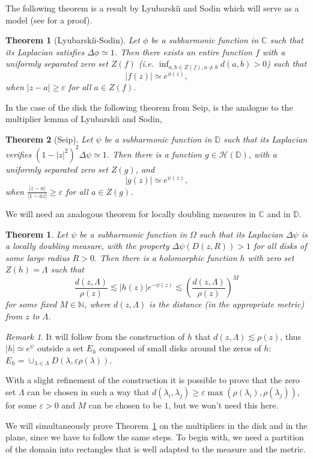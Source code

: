 \documentclass[12pt,twoside,final,psamsfonts]{amsart}
\theoremstyle{plain}
\newtheorem*{teor*}{Theorem}
\newtheorem{teor}{Theorem}
\theoremstyle{remark}
\newtheorem*{remark}{Remark}
\theoremstyle{definition}
\newcommand{\C}{{\mathbb C}}
\newcommand{\N}{{\mathbb N}}
\newcommand{\D}{{\mathbb D}}
\renewcommand{\H}{{\mathcal H}}
\begin{document}
The following theorem is a
result by Lyubarski{\u\i} and Sodin which will serve as a model
(see \cite{LyuSei94} for a proof).

\begin{teor*}[Lyubarski{\u\i}-Sodin]
Let $\phi$ be a subharmonic function in $\C$ such that its Laplacian 
satisfies $\Delta
\phi\simeq 1$. Then there exists an entire function $f$ with a uniformly 
separated 
zero set $Z(f)$ (i.e. $\inf_{a,b\in Z(f),a\ne b}d(a,b)>0$) such that 
\[
|f(z)|\simeq e^{\phi(z)},
\]
when $|z-a|\ge \varepsilon$ for all $a\in Z(f)$.
\end{teor*}


In the case of the disk the following theorem from Seip, \cite{Seip95b} is the
analogue to the multiplier lemma of Lyubarski{\u\i} and Sodin,

\begin{teor*}[Seip]
Let $\psi$ be a subharmonic function in $\D$ such that its Laplacian verifies
$(1-|z|^2)^2\Delta \psi\simeq 1$. Then there is a function $g\in\H(\D)$, with 
a  uniformly separated zero set $Z(g)$, and 
\[
|g(z)|\simeq e^{\psi(z)},
\]
when $\frac {|z-a|}{|1-\bar a z|}\ge \varepsilon$ for all $a\in Z(g)$.
\end{teor*}

We will need an analogous theorem for locally
doubling measures in $\C$ and in $\D$. 

\begin{teor}\label{multiplicador} 
Let $\psi$ be a subharmonic function in $\Omega$ such that its Laplacian
$\Delta \psi$ is a locally
doubling measure,  with the property $\Delta\psi (D(z,R))>1$
for all disks of some large radius $R>0$.  Then there is a holomorphic function
$h$ with zero set $Z(h)=\Lambda$ such that  
\[
\frac{d(z,\Lambda)}{\rho(z)}\lesssim
|h(z)|e^{-\psi(z)}\lesssim \left(\frac{d(z,\Lambda)}{\rho(z)}\right)^M
\]
for some fixed $M\in\N$, where $d(z,\Lambda)$ is the distance 
(in the appropriate metric) from $z$ to $\Lambda$.
\end{teor}
\begin{remark}
It will follow 
from the construction of $h$ that $d(z,\Lambda)\lesssim\rho(z)$,
thus  $|h|\simeq e^{\psi}$ 
outside a set $E_h$ composed  
of small disks around the zeros of $h$:
$E_h=\cup_{\lambda\in\Lambda}D(\lambda,\varepsilon\rho(\lambda))$.

With a slight refinement of the construction it is possible to prove that the
zero set $\Lambda$ can be chosen in such a way that $d(\lambda_i,\lambda_j)\ge
\varepsilon \max(\rho(\lambda_i),\rho(\lambda_j))$, for some $\varepsilon>0$
and $M$ can be chosen to be $1$, but we won't need this here.
\end{remark}
We will simultaneously prove Theorem~\ref{multiplicador} on the multipliers 
in the disk and in the plane, since we have to follow the same 
steps. To begin with,
we need a partition of the domain into rectangles that is 
well adapted to the measure
and the metric.  
\end{document}
